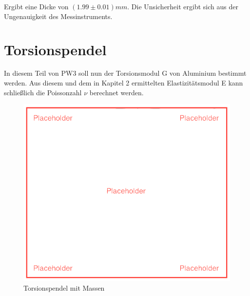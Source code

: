 \documentclass[12pt,a4paper]{article}
\begin{document}
\begin{multicols}{2}

Ergibt eine Dicke von \textbf{$(1.99 \pm 0.01)mm$}. Die Unsicherheit ergibt sich aus der Ungenauigkeit des Messinstruments.\\



\section{Torsionspendel}
In diesem Teil von PW3 soll nun der Torsionsmodul G von Aluminium bestimmt werden. Aus diesem und dem in Kapitel 2 ermittelten Elastizitätsmodul E kann schließlich die Poissonzahl $\nu $ berechnet werden.\\

\begin{figure}[H]
	\centering
  	\includegraphics[scale=0.4]{./figure/placeholder.png}
	\caption{Torsionspendel mit Massen}
	\label{fig:torsion}
\end{figure}


\end{multicols}
\end{document}

